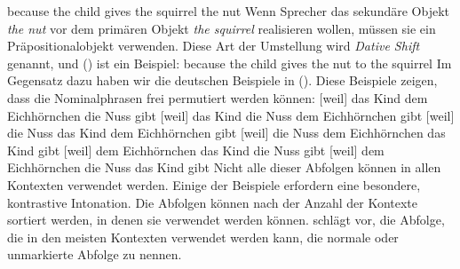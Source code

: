 \ea
because the child gives the squirrel the nut \english
\z
Wenn Sprecher das sekundäre Objekt \emph{the nut} vor dem primären Objekt \emph{the
  squirrel} realisieren wollen, müssen sie ein Präpositionalobjekt verwenden. Diese Art der Umstellung wird
\emph{Dative Shift} genannt, und () ist ein Beispiel:
\ea
because the child gives the nut to the squirrel \english
\z
Im Gegensatz dazu haben wir die deutschen Beispiele in (). Diese Beispiele zeigen, dass die Nominal\-phrasen
frei permutiert werden können:
\eal
\ex
{}[weil] das Kind dem Eichhörnchen die Nuss gibt\german
\ex
{}[weil] das Kind die Nuss dem Eichhörnchen gibt
\ex
{}[weil] die Nuss das Kind dem Eichhörnchen gibt
\ex
{}[weil] die Nuss dem Eichhörnchen das Kind gibt
\ex
{}[weil] dem Eichhörnchen das Kind die Nuss gibt
\ex
{}[weil] dem Eichhörnchen die Nuss das Kind gibt
\zl
Nicht alle dieser Abfolgen können in allen Kontexten verwendet werden. Einige der Beispiele erfordern eine besondere,
kontrastive Intonation. Die Abfolgen können nach der Anzahl der Kontexte sortiert werden, in denen
sie verwendet werden können. \citet{Hoehle82a} schlägt vor, die Abfolge, die in den meisten Kontexten verwendet werden kann, die
normale oder unmarkierte Abfolge zu nennen.

